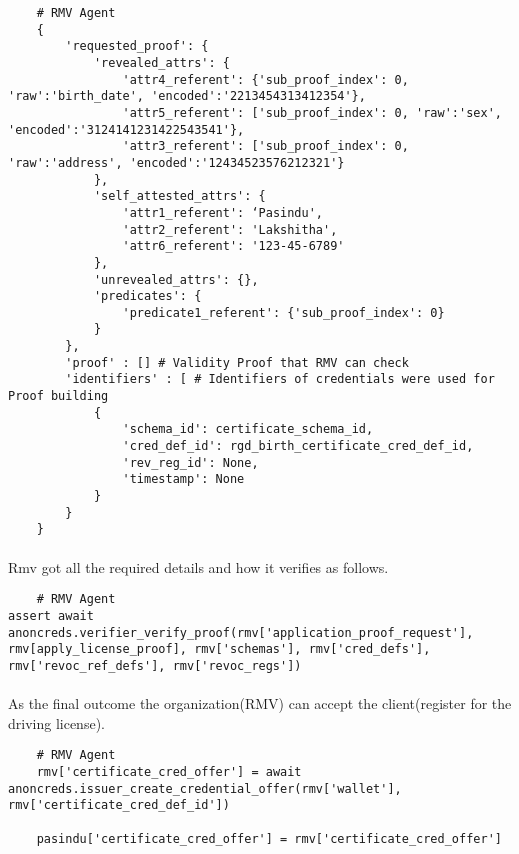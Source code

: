 \begin{verbatim}
    # RMV Agent
    {
        'requested_proof': {
            'revealed_attrs': {
                'attr4_referent': {'sub_proof_index': 0, 'raw':'birth_date', 'encoded':'2213454313412354'},
                'attr5_referent': ['sub_proof_index': 0, 'raw':'sex', 'encoded':'3124141231422543541'},
                'attr3_referent': ['sub_proof_index': 0, 'raw':'address', 'encoded':'12434523576212321'}
            },
            'self_attested_attrs': {
                'attr1_referent': ‘Pasindu',
                'attr2_referent': 'Lakshitha',
                'attr6_referent': '123-45-6789'
            },
            'unrevealed_attrs': {},
            'predicates': {
                'predicate1_referent': {'sub_proof_index': 0}
            }
        },
        'proof' : [] # Validity Proof that RMV can check
        'identifiers' : [ # Identifiers of credentials were used for Proof building
            {
                'schema_id': certificate_schema_id,
                'cred_def_id': rgd_birth_certificate_cred_def_id,
                'rev_reg_id': None,
                'timestamp': None
            }
        }
    }
\end{verbatim}

\paragraph{}
Rmv got all the required details and how it verifies as follows.

\begin{verbatim}
    # RMV Agent
assert await anoncreds.verifier_verify_proof(rmv['application_proof_request'], rmv[apply_license_proof], rmv['schemas'], rmv['cred_defs'], rmv['revoc_ref_defs'], rmv['revoc_regs'])
\end{verbatim}

\paragraph{}
As the final outcome the organization(RMV) can accept the client(register for the driving license).

\begin{verbatim}
    # RMV Agent
    rmv['certificate_cred_offer'] = await anoncreds.issuer_create_credential_offer(rmv['wallet'], rmv['certificate_cred_def_id'])
    
    pasindu['certificate_cred_offer'] = rmv['certificate_cred_offer']
\end{verbatim}